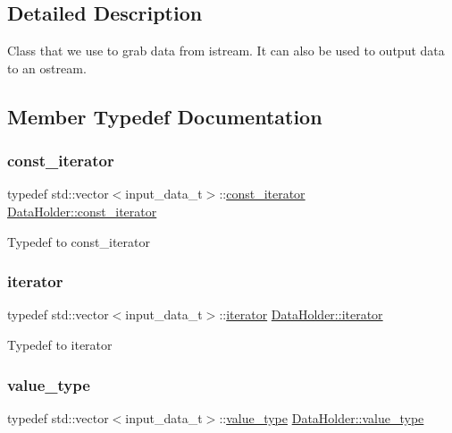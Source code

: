 \subsection{Detailed Description}
Class that we use to grab data from istream. It can also be used to output data to an ostream. 

\subsection{Member Typedef Documentation}
\mbox{\label{classDataHolder_a396f5981e656ed389de16190968a2bf8}} 
\subsubsection{\texorpdfstring{const\+\_\+iterator}{const\_iterator}}
{\footnotesize\ttfamily typedef std\+::vector$<$input\+\_\+data\+\_\+t$>$\+::\hyperlink{classDataHolder_a396f5981e656ed389de16190968a2bf8}{const\+\_\+iterator} \hyperlink{classDataHolder_a396f5981e656ed389de16190968a2bf8}{Data\+Holder\+::const\+\_\+iterator}}

Typedef to const\+\_\+iterator \mbox{\label{classDataHolder_afc27d248b4761952f2318a18ad5a2a15}} 
\subsubsection{\texorpdfstring{iterator}{iterator}}
{\footnotesize\ttfamily typedef std\+::vector$<$input\+\_\+data\+\_\+t$>$\+::\hyperlink{classDataHolder_afc27d248b4761952f2318a18ad5a2a15}{iterator} \hyperlink{classDataHolder_afc27d248b4761952f2318a18ad5a2a15}{Data\+Holder\+::iterator}}

Typedef to iterator \mbox{\label{classDataHolder_a01e6e078bc49ab1098ae5ea954f9493e}} 
\subsubsection{\texorpdfstring{value\+\_\+type}{value\_type}}
{\footnotesize\ttfamily typedef std\+::vector$<$input\+\_\+data\+\_\+t$>$\+::\hyperlink{classDataHolder_a01e6e078bc49ab1098ae5ea954f9493e}{value\+\_\+type} \hyperlink{classDataHolder_a01e6e078bc49ab1098ae5ea954f9493e}{Data\+Holder\+::value\+\_\+type}}

